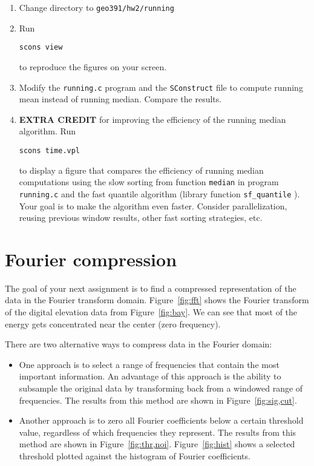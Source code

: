 \begin{enumerate}
\item Change directory to \verb#geo391/hw2/running#
\item Run 
\begin{verbatim}
scons view
\end{verbatim}
to reproduce the figures on your screen.
\item Modify the \texttt{running.c} program and the \texttt{SConstruct} file to compute running mean instead of running median. Compare the results.
\item \textbf{EXTRA CREDIT} for improving the efficiency of the running median algorithm. Run
\begin{verbatim}
scons time.vpl
\end{verbatim}
to display a figure that compares the efficiency of running median computations using the slow sorting from function \texttt{median} in program \texttt{running.c} and the fast quantile algorithm (library function \verb#sf_quantile# ). Your goal is to make the algorithm even faster. Consider parallelization, reusing previous window results, other fast sorting strategies, etc.
\end{enumerate}

\lstset{language=python,numbers=left,numberstyle=\tiny,showstringspaces=false}


\section{Fourier compression}


The goal of your next assignment is to find a compressed
representation of the data in the Fourier transform
domain. Figure~\ref{fig:fft} shows the Fourier transform of the
digital elevation data from Figure~\ref{fig:bay}. We can see that most
of the energy gets concentrated near the center (zero frequency). 

There are two alternative ways to compress data in the Fourier domain:
\begin{itemize}
\item One approach is to
select a range of frequencies that contain the most important
information. An advantage of this approach is the ability to subsample
the original data by transforming back from a windowed range of frequencies.
The results from this method are shown in Figure~\ref{fig:sig,cut}.
\item Another approach is to zero all Fourier coefficients below a certain threshold value, regardless of which frequencies they represent.  
 The results from this method are shown in Figure~\ref{fig:thr,noi}. Figure~\ref{fig:hist} shows a selected threshold plotted against the histogram of Fourier coefficients.
\end{itemize}


